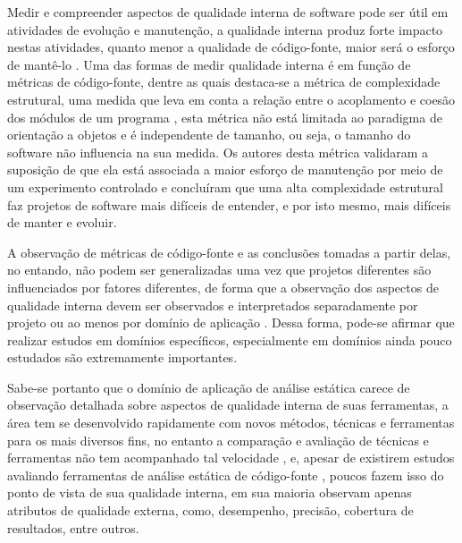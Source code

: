 Medir e compreender aspectos de qualidade interna de software pode ser útil em
atividades de evolução e manutenção, a qualidade interna produz forte impacto
nestas atividades, quanto menor a qualidade de código-fonte, maior será o
esforço de mantê-lo \cite{Terceiro2010}. Uma das formas de medir qualidade
interna é em função de métricas de código-fonte, dentre as quais destaca-se a
métrica de complexidade estrutural, uma medida que leva em conta a relação
entre o acoplamento e coesão dos módulos de um programa \cite{Darcy2005}, esta
métrica não está limitada ao paradigma de orientação a objetos e é independente
de tamanho, ou seja, o tamanho do software não influencia na sua medida.
Os autores desta métrica validaram a suposição de que ela
está associada a maior esforço de manutenção por meio de um
experimento controlado e concluíram que uma alta complexidade estrutural faz
projetos de software mais difíceis de entender, e por isto mesmo, mais difíceis
de manter e evoluir.


A observação de métricas de código-fonte e as conclusões tomadas a partir
delas, no entando, não podem ser generalizadas uma vez que projetos diferentes
são influenciados por fatores diferentes, de forma que a observação dos
aspectos de qualidade interna devem ser observados e interpretados
separadamente por projeto \cite{Terceiro2012Understanding} ou ao menos por
domínio de aplicação \cite{Meirelles2013}. Dessa forma, pode-se afirmar que
realizar estudos em domínios específicos, especialmente em domínios ainda pouco
estudados são extremamente importantes.


Sabe-se portanto que o domínio de aplicação de análise estática carece de observação
detalhada sobre aspectos de qualidade interna de suas ferramentas, a área tem
se desenvolvido rapidamente com novos métodos, técnicas e ferramentas para os
mais diversos fins, no entanto a comparação e avaliação de técnicas e
ferramentas não tem acompanhado tal velocidade \cite{Li2010}, e, apesar de
existirem estudos avaliando ferramentas de análise estática de
código-fonte \cite{Rutar2004, Kratkiewicz2005, Okun2007, Emanuelsson2008,
Wedyan2009, Mantere2009, Al2010, Li2010, Johns2011, Alemerien2013, Ataide2014},
poucos fazem isso do ponto de vista de sua qualidade interna, em sua maioria
observam apenas atributos de qualidade
externa, como, desempenho, precisão, cobertura de resultados, entre outros.

